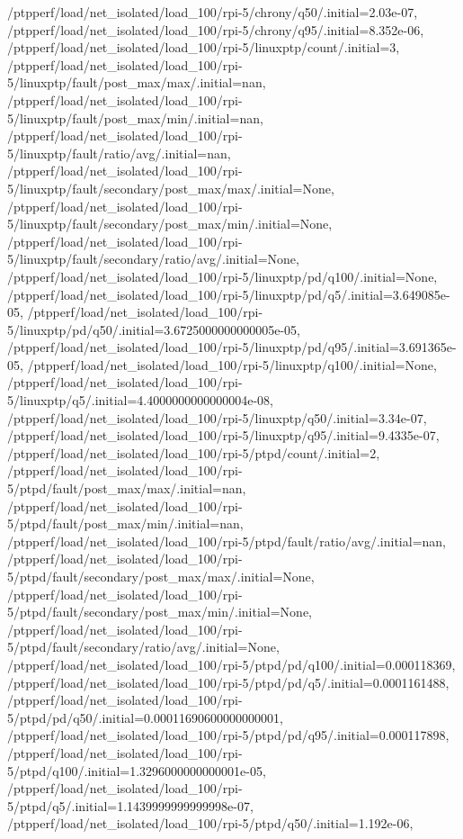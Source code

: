 {    /ptpperf/load/net_isolated/load_100/rpi-5/chrony/q50/.initial=2.03e-07,
    /ptpperf/load/net_isolated/load_100/rpi-5/chrony/q95/.initial=8.352e-06,
    /ptpperf/load/net_isolated/load_100/rpi-5/linuxptp/count/.initial=3,
    /ptpperf/load/net_isolated/load_100/rpi-5/linuxptp/fault/post_max/max/.initial=nan,
    /ptpperf/load/net_isolated/load_100/rpi-5/linuxptp/fault/post_max/min/.initial=nan,
    /ptpperf/load/net_isolated/load_100/rpi-5/linuxptp/fault/ratio/avg/.initial=nan,
    /ptpperf/load/net_isolated/load_100/rpi-5/linuxptp/fault/secondary/post_max/max/.initial=None,
    /ptpperf/load/net_isolated/load_100/rpi-5/linuxptp/fault/secondary/post_max/min/.initial=None,
    /ptpperf/load/net_isolated/load_100/rpi-5/linuxptp/fault/secondary/ratio/avg/.initial=None,
    /ptpperf/load/net_isolated/load_100/rpi-5/linuxptp/pd/q100/.initial=None,
    /ptpperf/load/net_isolated/load_100/rpi-5/linuxptp/pd/q5/.initial=3.649085e-05,
    /ptpperf/load/net_isolated/load_100/rpi-5/linuxptp/pd/q50/.initial=3.6725000000000005e-05,
    /ptpperf/load/net_isolated/load_100/rpi-5/linuxptp/pd/q95/.initial=3.691365e-05,
    /ptpperf/load/net_isolated/load_100/rpi-5/linuxptp/q100/.initial=None,
    /ptpperf/load/net_isolated/load_100/rpi-5/linuxptp/q5/.initial=4.4000000000000004e-08,
    /ptpperf/load/net_isolated/load_100/rpi-5/linuxptp/q50/.initial=3.34e-07,
    /ptpperf/load/net_isolated/load_100/rpi-5/linuxptp/q95/.initial=9.4335e-07,
    /ptpperf/load/net_isolated/load_100/rpi-5/ptpd/count/.initial=2,
    /ptpperf/load/net_isolated/load_100/rpi-5/ptpd/fault/post_max/max/.initial=nan,
    /ptpperf/load/net_isolated/load_100/rpi-5/ptpd/fault/post_max/min/.initial=nan,
    /ptpperf/load/net_isolated/load_100/rpi-5/ptpd/fault/ratio/avg/.initial=nan,
    /ptpperf/load/net_isolated/load_100/rpi-5/ptpd/fault/secondary/post_max/max/.initial=None,
    /ptpperf/load/net_isolated/load_100/rpi-5/ptpd/fault/secondary/post_max/min/.initial=None,
    /ptpperf/load/net_isolated/load_100/rpi-5/ptpd/fault/secondary/ratio/avg/.initial=None,
    /ptpperf/load/net_isolated/load_100/rpi-5/ptpd/pd/q100/.initial=0.000118369,
    /ptpperf/load/net_isolated/load_100/rpi-5/ptpd/pd/q5/.initial=0.0001161488,
    /ptpperf/load/net_isolated/load_100/rpi-5/ptpd/pd/q50/.initial=0.00011690600000000001,
    /ptpperf/load/net_isolated/load_100/rpi-5/ptpd/pd/q95/.initial=0.000117898,
    /ptpperf/load/net_isolated/load_100/rpi-5/ptpd/q100/.initial=1.3296000000000001e-05,
    /ptpperf/load/net_isolated/load_100/rpi-5/ptpd/q5/.initial=1.1439999999999998e-07,
    /ptpperf/load/net_isolated/load_100/rpi-5/ptpd/q50/.initial=1.192e-06,
}
